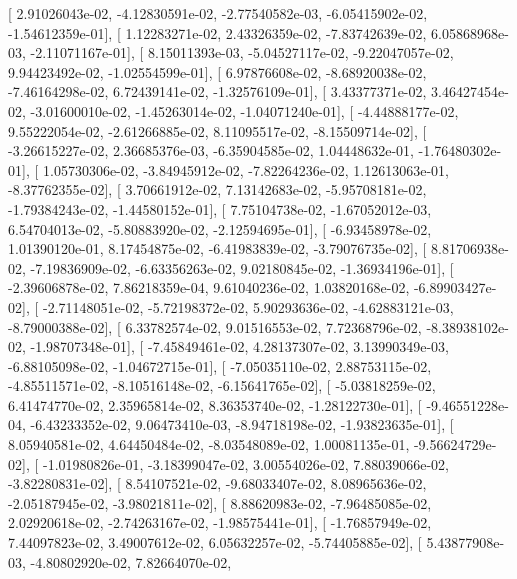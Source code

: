 \documentclass{article}
\begin{document}
       [  2.91026043e-02,  -4.12830591e-02,  -2.77540582e-03,
         -6.05415902e-02,  -1.54612359e-01],
       [  1.12283271e-02,   2.43326359e-02,  -7.83742639e-02,
          6.05868968e-03,  -2.11071167e-01],
       [  8.15011393e-03,  -5.04527117e-02,  -9.22047057e-02,
          9.94423492e-02,  -1.02554599e-01],
       [  6.97876608e-02,  -8.68920038e-02,  -7.46164298e-02,
          6.72439141e-02,  -1.32576109e-01],
       [  3.43377371e-02,   3.46427454e-02,  -3.01600010e-02,
         -1.45263014e-02,  -1.04071240e-01],
       [ -4.44888177e-02,   9.55222054e-02,  -2.61266885e-02,
          8.11095517e-02,  -8.15509714e-02],
       [ -3.26615227e-02,   2.36685376e-03,  -6.35904585e-02,
          1.04448632e-01,  -1.76480302e-01],
       [  1.05730306e-02,  -3.84945912e-02,  -7.82264236e-02,
          1.12613063e-01,  -8.37762355e-02],
       [  3.70661912e-02,   7.13142683e-02,  -5.95708181e-02,
         -1.79384243e-02,  -1.44580152e-01],
       [  7.75104738e-02,  -1.67052012e-03,   6.54704013e-02,
         -5.80883920e-02,  -2.12594695e-01],
       [ -6.93458978e-02,   1.01390120e-01,   8.17454875e-02,
         -6.41983839e-02,  -3.79076735e-02],
       [  8.81706938e-02,  -7.19836909e-02,  -6.63356263e-02,
          9.02180845e-02,  -1.36934196e-01],
       [ -2.39606878e-02,   7.86218359e-04,   9.61040236e-02,
          1.03820168e-02,  -6.89903427e-02],
       [ -2.71148051e-02,  -5.72198372e-02,   5.90293636e-02,
         -4.62883121e-03,  -8.79000388e-02],
       [  6.33782574e-02,   9.01516553e-02,   7.72368796e-02,
         -8.38938102e-02,  -1.98707348e-01],
       [ -7.45849461e-02,   4.28137307e-02,   3.13990349e-03,
         -6.88105098e-02,  -1.04672715e-01],
       [ -7.05035110e-02,   2.88753115e-02,  -4.85511571e-02,
         -8.10516148e-02,  -6.15641765e-02],
       [ -5.03818259e-02,   6.41474770e-02,   2.35965814e-02,
          8.36353740e-02,  -1.28122730e-01],
       [ -9.46551228e-04,  -6.43233352e-02,   9.06473410e-03,
         -8.94718198e-02,  -1.93823635e-01],
       [  8.05940581e-02,   4.64450484e-02,  -8.03548089e-02,
          1.00081135e-01,  -9.56624729e-02],
       [ -1.01980826e-01,  -3.18399047e-02,   3.00554026e-02,
          7.88039066e-02,  -3.82280831e-02],
       [  8.54107521e-02,  -9.68033407e-02,   8.08965636e-02,
         -2.05187945e-02,  -3.98021811e-02],
       [  8.88620983e-02,  -7.96485085e-02,   2.02920618e-02,
         -2.74263167e-02,  -1.98575441e-01],
       [ -1.76857949e-02,   7.44097823e-02,   3.49007612e-02,
          6.05632257e-02,  -5.74405885e-02],
       [  5.43877908e-03,  -4.80802920e-02,   7.82664070e-02,
\end{document}

